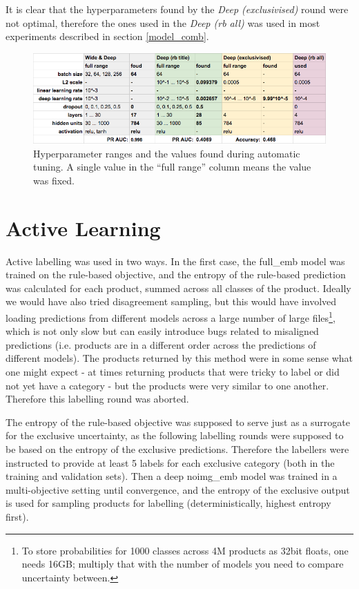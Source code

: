 It is clear that the hyperparameters found by the \textit{Deep (exclusivised)} round were not optimal, therefore the ones used in the \textit{Deep (rb all)} was used in most experiments described in section \ref{model_comb}.

\begin{figure}
  \includegraphics[width=\linewidth]{figures/tuning_rounds}
  \caption{Hyperparameter ranges and the values found during automatic tuning. A single value in the ``full range'' column means the value was fixed.}
  \label{tuning_rounds}
\end{figure}

\section{Active Learning}
\label{exp_al}

Active labelling was used in two ways.
In the first case, the full\_emb model was trained on the rule-based objective, and the entropy of the rule-based prediction was calculated for each product, summed across all classes of the product.
Ideally we would have also tried disagreement sampling, but this would have involved loading predictions from different models across a large number of large files\footnote{To store probabilities for 1000 classes across 4M products as 32bit floats, one needs 16GB; multiply that with the number of models you need to compare uncertainty between.}, which is not only slow but can easily introduce bugs related to misaligned predictions (i.e. products are in a different order across the predictions of different models).
The products returned by this method were in some sense what one might expect - at times returning products that were tricky to label or did not yet have a category - but the products were very similar to one another. Therefore this labelling round was aborted.

The entropy of the rule-based objective was supposed to serve just as a surrogate for the exclusive uncertainty, as the following labelling rounds were supposed to be based on the entropy of the exclusive predictions.
Therefore the labellers were instructed to provide at least 5 labels for each exclusive category (both in the training and validation sets).
Then a deep noimg\_emb model was trained in a multi-objective setting until convergence, and the entropy of the exclusive output is used for sampling products for labelling (deterministically, highest entropy first).

